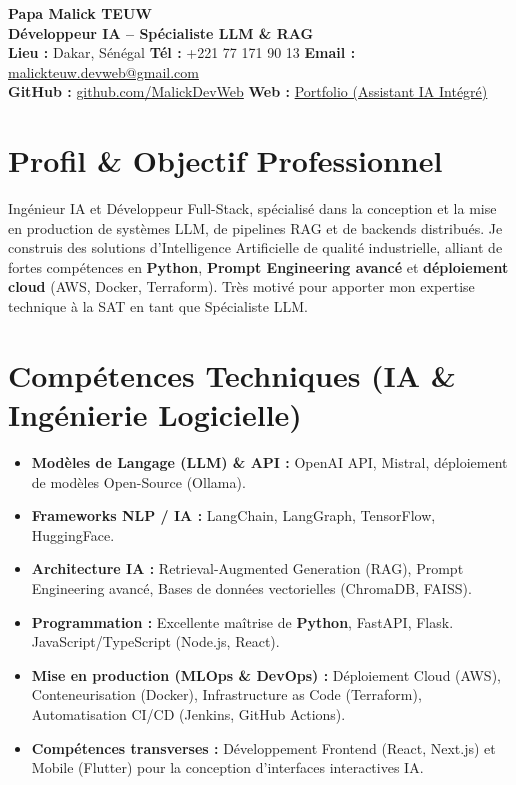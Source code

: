\documentclass[10pt,a4paper]{article}
\begin{document}
\begin{center}
    {\Huge \textbf{\color{dark} Papa Malick TEUW}}\\[0.2cm]
    {\Large \textbf{\color{primary} Développeur IA – Spécialiste LLM \& RAG}}\\[0.3cm]
    \textbf{Lieu :} Dakar, Sénégal \quad \textbf{Tél :} +221 77 171 90 13 \quad \textbf{Email :} \href{mailto:malickteuw.devweb@gmail.com}{malickteuw.devweb@gmail.com}\\[0.1cm]
    \textbf{GitHub :} \href{https://github.com/MalickDevWeb}{github.com/MalickDevWeb} \quad \textbf{Web :} \href{https://papa-malick-teuw-dev-ia.vercel.app/}{Portfolio (Assistant IA Intégré)}
\end{center}

\vspace{0.3cm}

\section*{Profil \& Objectif Professionnel}
Ingénieur IA et Développeur Full-Stack, spécialisé dans la conception et la mise en production de systèmes LLM, de pipelines RAG et de backends distribués. Je construis des solutions d'Intelligence Artificielle de qualité industrielle, alliant de fortes compétences en \textbf{Python}, \textbf{Prompt Engineering avancé} et \textbf{déploiement cloud} (AWS, Docker, Terraform). Très motivé pour apporter mon expertise technique à la SAT en tant que Spécialiste LLM.

\section*{Compétences Techniques (IA \& Ingénierie Logicielle)}
\begin{itemize}[leftmargin=0.5cm, label={--}, itemsep=2pt]
    \item \textbf{Modèles de Langage (LLM) \& API :} OpenAI API, Mistral, déploiement de modèles Open-Source (Ollama).
    \item \textbf{Frameworks NLP / IA :} LangChain, LangGraph, TensorFlow, HuggingFace.
    \item \textbf{Architecture IA :} Retrieval-Augmented Generation (RAG), Prompt Engineering avancé, Bases de données vectorielles (ChromaDB, FAISS).
    \item \textbf{Programmation :} Excellente maîtrise de \textbf{Python}, FastAPI, Flask. JavaScript/TypeScript (Node.js, React).
    \item \textbf{Mise en production (MLOps \& DevOps) :} Déploiement Cloud (AWS), Conteneurisation (Docker), Infrastructure as Code (Terraform), Automatisation CI/CD (Jenkins, GitHub Actions).
    \item \textbf{Compétences transverses :} Développement Frontend (React, Next.js) et Mobile (Flutter) pour la conception d'interfaces interactives IA.
\end{itemize}
\end{document}
